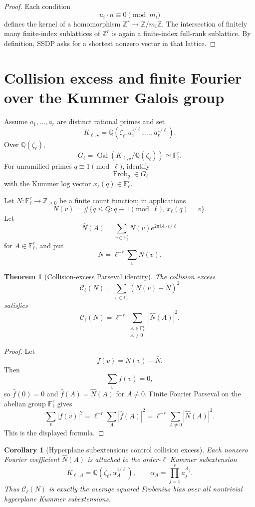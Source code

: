 \documentclass[11pt]{article}
\newtheorem{theorem}{Theorem}
\newtheorem{corollary}{Corollary}
\newcommand{\Z}{\mathbb Z}
\newcommand{\Q}{\mathbb Q}
\newcommand{\F}{\mathbb F}
\newcommand{\Gal}{\operatorname{Gal}}
\newcommand{\Frob}{\operatorname{Frob}}
\begin{document}
\begin{proof}
Each condition
\[
u_i\cdot n\equiv0\pmod{m_i}
\]
defines the kernel of a homomorphism \(\Z^r\to\Z/m_i\Z\).  The intersection of finitely many finite-index sublattices of \(\Z^r\) is again a finite-index full-rank sublattice.  By definition, SSDP asks for a shortest nonzero vector in that lattice.
\end{proof}

\section{Collision excess and finite Fourier over the Kummer Galois group}

Assume \(a_1,\ldots,a_r\) are distinct rational primes and set
\[
K_{\ell,\star}=\Q(\zeta_\ell,a_1^{1/\ell},\ldots,a_r^{1/\ell}).
\]
Over \(\Q(\zeta_\ell)\),
\[
G_\ell=\Gal(K_{\ell,\star}/\Q(\zeta_\ell))\simeq\F_\ell^r.
\]
For unramified primes \(q\equiv1\pmod\ell\), identify
\[
\Frob_q\in G_\ell
\]
with the Kummer log vector \(x_\ell(q)\in\F_\ell^r\).

Let \(N:\F_\ell^r\to\Z_{\ge0}\) be a finite count function; in applications
\[
N(v)=\#\{q\le Q:q\equiv1\pmod\ell,\ x_\ell(q)=v\}.
\]
Let
\[
\widehat N(A)=\sum_{v\in\F_\ell^r}N(v)e^{2\pi i A\cdot v/\ell}
\]
for \(A\in\F_\ell^r\), and put
\[
\overline N=\ell^{-r}\sum_v N(v).
\]

\begin{theorem}[Collision-excess Parseval identity]\label{T:parseval-collision}
The collision excess
\[
\mathcal C_\ell(N)
=
\sum_{v\in\F_\ell^r}\left(N(v)-\overline N\right)^2
\]
satisfies
\[
\mathcal C_\ell(N)
=
\ell^{-r}
\sum_{\substack{A\in\F_\ell^r\\A\ne0}}
|\widehat N(A)|^2.
\]
\end{theorem}

\begin{proof}
Let
\[
f(v)=N(v)-\overline N.
\]
Then
\[
\sum_v f(v)=0,
\]
so \(\widehat f(0)=0\) and \(\widehat f(A)=\widehat N(A)\) for \(A\ne0\).  Finite Fourier Parseval on the abelian group \(\F_\ell^r\) gives
\[
\sum_v |f(v)|^2
=
\ell^{-r}\sum_A|\widehat f(A)|^2
=
\ell^{-r}\sum_{A\ne0}|\widehat N(A)|^2.
\]
This is the displayed formula.
\end{proof}

\begin{corollary}[Hyperplane subextensions control collision excess]\label{C:subextension-control}
Each nonzero Fourier coefficient \(\widehat N(A)\) is attached to the order-\(\ell\) Kummer subextension
\[
K_{\ell,A}=\Q(\zeta_\ell,\alpha_A^{1/\ell}),
\qquad
\alpha_A=\prod_{j=1}^r a_j^{A_j}.
\]
Thus \(\mathcal C_\ell(N)\) is exactly the average squared Frobenius bias over all nontrivial hyperplane Kummer subextensions.
\end{corollary}
\end{document}
